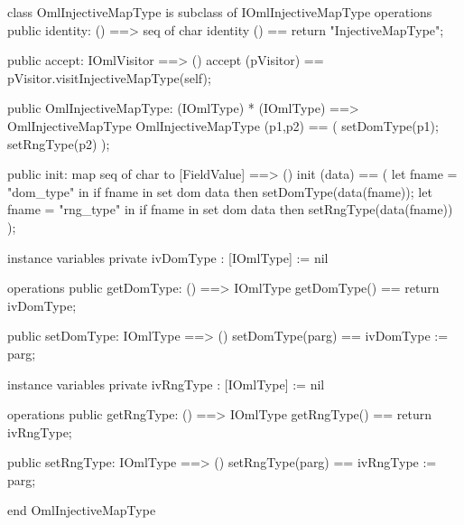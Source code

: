 \begin{vdm_al}
class OmlInjectiveMapType is subclass of IOmlInjectiveMapType
operations
  public identity: () ==> seq of char
  identity () == return "InjectiveMapType";

  public accept: IOmlVisitor ==> ()
  accept (pVisitor) == pVisitor.visitInjectiveMapType(self);

  public OmlInjectiveMapType:
      (IOmlType) *
      (IOmlType) ==> OmlInjectiveMapType
  OmlInjectiveMapType (p1,p2) == 
   ( setDomType(p1);
     setRngType(p2) );

  public init: map seq of char to [FieldValue] ==> ()
  init (data) ==
    ( let fname = "dom_type" in
        if fname in set dom data
        then setDomType(data(fname));
      let fname = "rng_type" in
        if fname in set dom data
        then setRngType(data(fname)) );

instance variables
  private ivDomType : [IOmlType] := nil

operations
  public getDomType: () ==> IOmlType
  getDomType() == return ivDomType;

  public setDomType: IOmlType ==> ()
  setDomType(parg) == ivDomType := parg;

instance variables
  private ivRngType : [IOmlType] := nil

operations
  public getRngType: () ==> IOmlType
  getRngType() == return ivRngType;

  public setRngType: IOmlType ==> ()
  setRngType(parg) == ivRngType := parg;

end OmlInjectiveMapType
\end{vdm_al}

